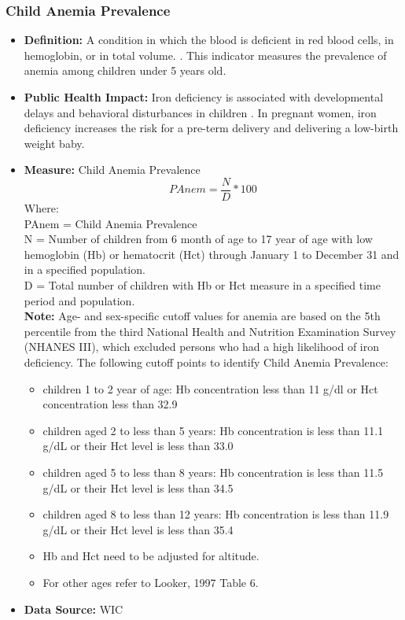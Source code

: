 \documentclass[12pt,letterpaper]{report}
\begin{document}
		\subsubsection{Child Anemia Prevalence} 
	\begin{itemize}
		\item \textbf{Definition:} A condition in which the blood is deficient in red blood cells, in hemoglobin, or in total volume. \cite{merriam2004merriam}.  This indicator measures the prevalence of anemia among children under 5 years old. 
		\item \textbf{Public Health Impact:} Iron deficiency is associated with developmental delays and behavioral disturbances in children \cite{idjradinata1993reversal}. In pregnant women, iron deficiency increases the risk for a pre-term delivery and delivering a low-birth weight baby. \cite{looker1997prevalence}
		
		
		\item \textbf{Measure:} Child Anemia Prevalence 
			\begin{equation}
				PAnem = \frac{N}{D} *100
			\end{equation}
Where: \\
			PAnem = Child Anemia Prevalence \\
			
			N = Number of children from 6 month of age to 17 year of age with low hemoglobin (Hb) or hematocrit (Hct) through January 1 to December 31 and in a specified population. \\
			
			D = Total number of children with Hb or Hct measure in a specified time period and population. \\

\textbf{Note:} Age- and sex-specific cutoff values for anemia are based on the 5th percentile from
  the third National Health and Nutrition Examination Survey (NHANES III), which
  excluded persons who had a high likelihood of iron deficiency.  
The following cutoff points to identify Child Anemia Prevalence:
	\begin{itemize}
		\item children 1 to 2 year of age: Hb concentration less than 11 g/dl or Hct concentration less than 32.9%
		\item children aged 2 to less than 5 years: Hb concentration is less than 11.1 g/dL or their Hct level is less than 33.0%
		\item children aged 5 to less than 8 years: Hb concentration is less than 11.5 g/dL or their Hct level is less than 34.5%
		\item children aged 8 to less than 12 years: Hb concentration is less than 11.9 g/dL or their Hct level is less than 35.4%
		\item Hb and Hct need to be adjusted for altitude.
		\item For other ages refer to Looker, 1997 Table 6. \cite{looker1997prevalence}
	\end{itemize}

		\item \textbf{Data Source:} WIC
	\end{itemize}
\end{document}
